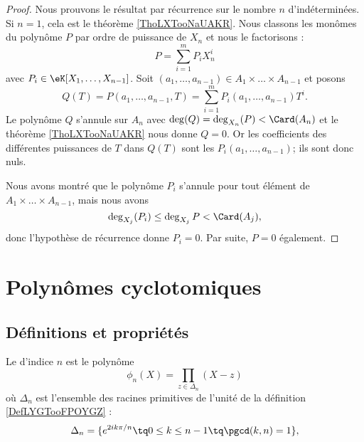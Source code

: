 \begin{proof}
    Nous prouvons le résultat par récurrence sur le nombre \( n\) d'indéterminées. Si \( n=1\), cela est le théorème \ref{ThoLXTooNaUAKR}. Nous classons les monômes du polynôme \( P\) par ordre de puissance de \( X_n\) et nous le factorisons :
    \begin{equation}
        P=\sum_{i=1}^mP_iX_n^i
    \end{equation}
    avec \( P_i\in \eK[X_1,\ldots, X_{n-1}]\). Soit \( (a_1,\ldots, a_{n-1})\in A_1\times \ldots \times A_{n-1}\) et posons
    \begin{equation}
        Q(T)=P(a_1,\ldots, a_{n-1},T)= \sum_{i=1}^mP_i(a_1,\ldots, a_{n-1})T^i.
    \end{equation}
    Le polynôme \( Q\) s'annule sur \( A_n\) avec \( \deg(Q)=\deg_{X_n}(P)<\Card(A_n)\) et le théorème \ref{ThoLXTooNaUAKR} nous donne \( Q=0\). Or les coefficients des différentes puissances de \( T\) dans \( Q(T) \) sont les \( P_i(a_1,\ldots, a_{n-1})\); ils sont donc nuls.

    Nous avons montré que le polynôme \( P_i\) s'annule pour tout élément de \( A_1\times \ldots \times A_{n-1}\), mais nous avons
    \begin{equation}
        \deg_{X_j}(P_i)\leq \deg_{X_j}P<\Card(A_j),
    \end{equation}
    donc l'hypothèse de récurrence donne \( P_i=0\). Par suite, \( P=0\) également.
\end{proof}

\section{Polynômes cyclotomiques}

\subsection{Définitions et propriétés}

\begin{definition}  \label{DefXGHooRAXlpp}
    Le  d'indice \( n\) est le polynôme
    \begin{equation}    \label{EqLjGYKK}
        \phi_n(X)=\prod_{z\in\Delta_n}(X-z)
    \end{equation}
    où \( \Delta_n\) est l'ensemble des racines primitives de l'unité de la définition \ref{DefLYGTooFPOYGZ} :
    \begin{equation}
        \Delta_n=\{  e^{2ik\pi/n}\tq 0\leq k\leq n-1\tq \pgcd(k,n)=1 \},
    \end{equation}
\end{definition}

